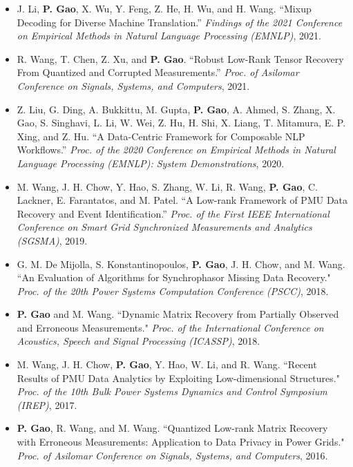 \documentclass{resume}
\begin{document}
\begin{itemize}[parsep=0.2ex]
\item {J. Li, {\bf P. Gao}, X. Wu, Y. Feng, Z. He, H. Wu, and H. Wang. ``Mixup Decoding for Diverse Machine Translation.'' \emph{Findings of the 2021 Conference on Empirical Methods in Natural Language Processing (EMNLP)}, 2021.}

\item {R. Wang, T. Chen, Z. Xu, and {\bf P. Gao}. ``Robust Low-Rank Tensor Recovery From Quantized and Corrupted Measurements.'' \emph{Proc. of Asilomar Conference on Signals, Systems, and Computers}, 2021.}

\item {Z. Liu, G. Ding, A. Bukkittu, M. Gupta, {\bf P. Gao}, A. Ahmed, S. Zhang, X. Gao, S. Singhavi, L. Li, W. Wei, Z. Hu, H. Shi, X. Liang, T. Mitamura, E. P. Xing, and Z. Hu. ``A Data-Centric Framework for Composable NLP Workflows.'' \emph{Proc. of the 2020 Conference on Empirical Methods in Natural Language Processing (EMNLP): System Demonstrations}, 2020.}

\item {M. Wang, J. H. Chow, Y. Hao, S. Zhang, W. Li, R. Wang, {\bf P. Gao}, C. Lackner, E. Farantatos, and M. Patel. ``A Low-rank Framework of PMU Data Recovery and Event Identification.'' \emph{Proc. of the First IEEE International Conference on Smart Grid Synchronized Measurements and Analytics (SGSMA)}, 2019.}

\item {G. M. De Mijolla, S. Konstantinopoulos, {\bf P. Gao}, J. H. Chow, and M. Wang. ``An Evaluation of Algorithms for Synchrophasor Missing Data Recovery." \emph{Proc. of the 20th Power Systems Computation Conference (PSCC)}, 2018.}

\item {{\bf P. Gao} and M. Wang. ``Dynamic Matrix Recovery from Partially Observed and Erroneous Measurements." \emph{Proc. of the International Conference on Acoustics, Speech and Signal Processing (ICASSP)}, 2018.}

\item {M. Wang, J. H. Chow, {\bf P. Gao}, Y. Hao, W. Li, and R. Wang. ``Recent Results of PMU Data Analytics by Exploiting Low-dimensional Structures." \emph{Proc. of the 10th Bulk Power Systems Dynamics and Control Symposium (IREP)}, 2017.}

\item {{\bf P. Gao}, R. Wang, and M. Wang. ``Quantized Low-rank Matrix Recovery with Erroneous Measurements: Application to Data Privacy in Power Grids." \emph{Proc. of Asilomar Conference on Signals, Systems, and Computers}, 2016.}


\end{itemize}
\end{document}
